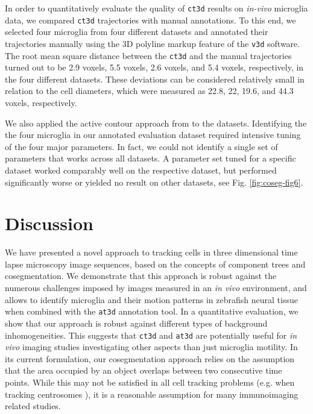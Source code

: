 In order to quantitatively evaluate the quality of \texttt{ct3d}
results on \textit{in-vivo} microglia data, we compared \texttt{ct3d}
trajectories with manual annotations. To this end, we selected four
microglia from four different datasets and annotated their
trajectories manually using the 3D polyline markup feature of the
\texttt{v3d} software. The root mean square distance between the
\texttt{ct3d} and the manual trajectories turned out to be 2.9 voxels,
5.5 voxels, 2.6 voxels, and 5.4 voxels, respectively, in the four
different datasets. These deviations can be considered relatively
small in relation to the cell diameters, which were measured as 22.8,
22, 19.6, and 44.3 voxels, respectively.

We also applied the active contour approach from \cite{chan2001active} to
the datasets. Identifying the the four microglia in our annotated
evaluation dataset required intensive tuning of the four major
parameters. In fact, we could not identify a single set
  of parameters that works across all datasets. A parameter set tuned
  for a specific dataset worked comparably well on the respective
  dataset, but performed significantly worse or yielded no result on
  other datasets, see Fig. \ref{fig:coseg-fig6}.

\section{Discussion}

We have presented a novel approach to tracking cells in three
dimensional time lapse microscopy image sequences, based on the
concepts of component trees and cosegmentation. We demonstrate that
this approach is robust against the numerous challenges imposed by
images measured in an \textit{in vivo} environment, and allows to
identify microglia and their motion patterns in zebrafish neural
tissue when combined with the \texttt{at3d} annotation tool. In a
quantitative evaluation, we show that our approach is robust against
different types of background inhomogeneities. This suggests that
\texttt{ct3d} and \texttt{at3d} are potentially useful for \textit{in
  vivo} imaging studies investigating other aspects than just
microglia motility. In its current formulation, our cosegmentation
approach relies on the assumption that the area occupied by an object
overlaps between two consecutive time points. While this may not be
satisfied in all cell tracking problems (e.g. when tracking
centrosomes \cite{Jaensch:10}), it is a reasonable assumption for
many immunoimaging related studies.

